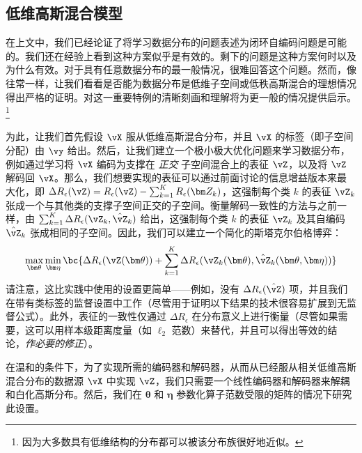 \documentclass[../../book-main_zh.tex]{subfiles}
\begin{document}
\subsection{低维高斯混合模型}

在上文中，我们已经论证了将学习数据分布的问题表述为闭环自编码问题是可能的。我们还在经验上看到这种方案似乎是有效的。剩下的问题是这种方案何时以及为什么有效。对于具有任意数据分布的最一般情况，很难回答这个问题。然而，像往常一样，让我们看看是否能为数据分布是低维子空间或低秩高斯混合的理想情况得出严格的证明。对这一重要特例的清晰刻画和理解将为更一般的情况提供启示。\footnote{因为大多数具有低维结构的分布都可以被该分布族很好地近似。}

为此，让我们首先假设 \(\vX\) 服从低维高斯混合分布，并且 \(\vX\) 的标签（即子空间分配）由 \(\vy\) 给出。然后，让我们建立一个极小极大优化问题来学习数据分布，例如通过学习将 \(\vX\) 编码为支撑在 \textit{正交} 子空间混合上的表征 \(\vZ\)，以及将 \(\vZ\) 解码回 \(\vX\)。那么，我们想要实现的表征可以通过前面讨论的信息增益版本来最大化，即 \( \Delta R_{\epsilon}(\vZ) = R_{\epsilon}(\vZ) - \sum_{k=1}^K R_{\epsilon}(\bm Z_k) \)，这强制每个类 \(k\) 的表征 \(\vZ_{k}\) 张成一个与其他类的支撑子空间正交的子空间。衡量解码一致性的方法与之前一样，由 \(\sum_{k = 1}^{K}\Delta R_\epsilon(\vZ_{k}, \hat{\vZ}_{k})\) 给出，这强制每个类 \(k\) 的表征 \(\vZ_{k}\) 及其自编码 \(\hat{\vZ}_{k}\) 张成相同的子空间。因此，我们可以建立一个简化的斯塔克尔伯格博弈：
\begin{equation}\label{eq:ctrl_msp_game}
    \max_{\bm \theta}\min_{\bm \eta}\bc{\Delta R_\epsilon(\vZ(\bm
        \theta)) + \sum_{k = 1}^{K}\Delta R_\epsilon(\vZ_{k}(\bm \theta),
    \hat{\vZ}_{k}(\bm \theta, \bm \eta))}
\end{equation}
请注意，这比实践中使用的设置更简单——例如，没有 \(\Delta R_\epsilon(\hat{\vZ})\) 项，并且我们在带有类标签的监督设置中工作（尽管用于证明以下结果的技术很容易扩展到无监督公式）。此外，表征的一致性仅通过 \(\Delta R_\epsilon\) 在分布意义上进行衡量（尽管如果需要，这可以用样本级距离度量（如 \(\ell_{2}\) 范数）来替代，并且可以得出等效的结论，\textit{作必要的修正}）。

在温和的条件下，为了实现所需的编码器和解码器，从而从已经服从相关低维高斯混合分布的数据源 \(\vX\) 中实现 \(\vZ\)，我们只需要一个线性编码器和解码器来解耦和白化高斯分布。然后，我们在 \(\bm \theta\) 和 \(\bm \eta\) 参数化算子范数受限的矩阵的情况下研究此设置。
\end{document}
